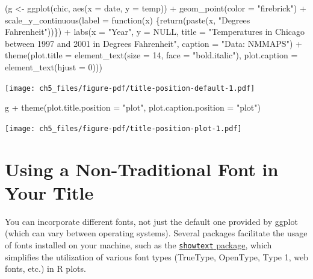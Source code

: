\documentclass[
  letterpaper,
]{scrbook}
\newenvironment{Shaded}{\begin{snugshade}}{\end{snugshade}}
\newcommand{\AttributeTok}[1]{\textcolor[rgb]{0.40,0.45,0.13}{#1}}
\newcommand{\ConstantTok}[1]{\textcolor[rgb]{0.56,0.35,0.01}{#1}}
\newcommand{\ControlFlowTok}[1]{\textcolor[rgb]{0.00,0.23,0.31}{#1}}
\newcommand{\DecValTok}[1]{\textcolor[rgb]{0.68,0.00,0.00}{#1}}
\newcommand{\FunctionTok}[1]{\textcolor[rgb]{0.28,0.35,0.67}{#1}}
\newcommand{\NormalTok}[1]{\textcolor[rgb]{0.00,0.23,0.31}{#1}}
\newcommand{\OtherTok}[1]{\textcolor[rgb]{0.00,0.23,0.31}{#1}}
\newcommand{\SpecialCharTok}[1]{\textcolor[rgb]{0.37,0.37,0.37}{#1}}
\newcommand{\StringTok}[1]{\textcolor[rgb]{0.13,0.47,0.30}{#1}}
\begin{document}
\begin{Shaded}
\begin{Highlighting}[]
\NormalTok{(g }\OtherTok{\textless{}{-}} \FunctionTok{ggplot}\NormalTok{(chic, }\FunctionTok{aes}\NormalTok{(}\AttributeTok{x =}\NormalTok{ date, }\AttributeTok{y =}\NormalTok{ temp)) }\SpecialCharTok{+}
  \FunctionTok{geom\_point}\NormalTok{(}\AttributeTok{color =} \StringTok{"firebrick"}\NormalTok{) }\SpecialCharTok{+}
  \FunctionTok{scale\_y\_continuous}\NormalTok{(}\AttributeTok{label =} \ControlFlowTok{function}\NormalTok{(x) \{}\FunctionTok{return}\NormalTok{(}\FunctionTok{paste}\NormalTok{(x, }\StringTok{"Degrees Fahrenheit"}\NormalTok{))\}) }\SpecialCharTok{+}
  \FunctionTok{labs}\NormalTok{(}\AttributeTok{x =} \StringTok{"Year"}\NormalTok{, }\AttributeTok{y =} \ConstantTok{NULL}\NormalTok{,}
       \AttributeTok{title =} \StringTok{"Temperatures in Chicago between 1997 and 2001 in Degrees Fahrenheit"}\NormalTok{,}
       \AttributeTok{caption =} \StringTok{"Data: NMMAPS"}\NormalTok{) }\SpecialCharTok{+}
  \FunctionTok{theme}\NormalTok{(}\AttributeTok{plot.title =} \FunctionTok{element\_text}\NormalTok{(}\AttributeTok{size =} \DecValTok{14}\NormalTok{, }\AttributeTok{face =} \StringTok{"bold.italic"}\NormalTok{),}
        \AttributeTok{plot.caption =} \FunctionTok{element\_text}\NormalTok{(}\AttributeTok{hjust =} \DecValTok{0}\NormalTok{)))}
\end{Highlighting}
\end{Shaded}

\texttt{[image: ch5\_files/figure-pdf/title-position-default-1.pdf]}

\begin{Shaded}
\begin{Highlighting}[]
\NormalTok{g }\SpecialCharTok{+} \FunctionTok{theme}\NormalTok{(}\AttributeTok{plot.title.position =} \StringTok{"plot"}\NormalTok{,}
          \AttributeTok{plot.caption.position =} \StringTok{"plot"}\NormalTok{)}
\end{Highlighting}
\end{Shaded}

\texttt{[image: ch5\_files/figure-pdf/title-position-plot-1.pdf]}

\section{Using a Non-Traditional Font in Your
Title}\label{using-a-non-traditional-font-in-your-title}

You can incorporate different fonts, not just the default one provided
by ggplot (which can vary between operating systems). Several packages
facilitate the usage of fonts installed on your machine, such as the
\href{https://github.com/yixuan/showtext}{\texttt{showtext} package},
which simplifies the utilization of various font types (TrueType,
OpenType, Type 1, web fonts, etc.) in R plots.
\end{document}
